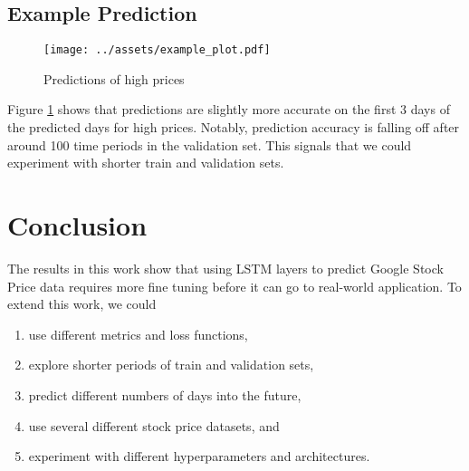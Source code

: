 \documentclass[10pt,twocolumn,letterpaper]{article}
\begin{document}
\subsection{Example Prediction}

\begin{figure}[!ht]
  \centering
  \texttt{[image: ../assets/example\_plot.pdf]}
  \caption{Predictions of high prices}
  \label{fig:example-plot}
\end{figure}
Figure \ref{fig:example-plot} shows that predictions are slightly more accurate on the first 3 days of the
predicted days for high prices. Notably, prediction accuracy is falling off after around 100 time periods in the
validation set. This signals that we could experiment with shorter train and validation sets.

\section{Conclusion}

The results in this work show that using LSTM layers to predict Google Stock Price data requires more fine
tuning before it can go to real-world application. To extend this work, we could
\begin{enumerate}
  \item use different metrics and loss functions,
  \item explore shorter periods of train and validation sets,
  \item predict different numbers of days into the future,
  \item use several different stock price datasets, and
  \item experiment with different hyperparameters and architectures.
\end{enumerate}
\end{document}
